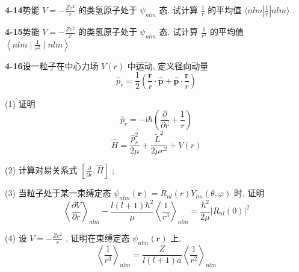 \vfill

\newpage
\vfill

\noindent
\textbf{4-14}\quad 势能 $V = -\frac{Ze^2}{r}$ 的类氢原子处于 $\psi_{nlm}$ 态. 试计算 $\frac{1}{r}$ 的平均值 $\langle nlm|\frac{1}{r}|nlm\rangle$ .

\vfill

\newpage
\vfill

\noindent
\textbf{4-15}\quad 势能 $V = -\frac{Ze^2}{r}$ 的类氢原子处于 $\psi_{nlm}$ 态. 试计算 $\frac{1}{r^2}$ 的平均值 $\left\langle nlm \mid \frac{1}{r^2} \mid nlm \right\rangle$

\vfill

\newpage
\vfill

\noindent
\textbf{4-16}\quad 设一粒子在中心力场 $V(r)$ 中运动, 定义径向动量
\begin{equation}\tag{1}
\hat {p} _ {r} = \frac {1}{2} \left(\frac {\boldsymbol {r}}{r} \cdot \hat {\boldsymbol {p}} + \hat {\boldsymbol {p}} \cdot \frac {\boldsymbol {r}}{r}\right)
\end{equation}

(1) 证明
\begin{equation}\tag{2}
\hat {p} _ {r} = - \mathrm{i} \hbar \left(\frac {\partial}{\partial r} + \frac {1}{r}\right)
\end{equation}
\begin{equation}\tag{3}
\hat {H} = \frac {\hat {p} _ {r} ^ {2}}{2 \mu} + \frac {\tilde {L} ^ {2}}{2 \mu r ^ {2}} + V (r)
\end{equation}

(2) 计算对易关系式 $\left[\frac{\partial}{\partial r}, \hat{H}\right]$ ; 

(3) 当粒子处于某一束缚定态 $\psi_{nlm}(\boldsymbol{r}) = R_{nl}(r)Y_{lm}(\theta, \varphi)$ 时, 证明
\begin{equation}\tag{4}
\left\langle \frac {\partial V}{\partial r} \right\rangle_ {n l m} - \frac {l (l + 1) \hbar^ {2}}{\mu} \left\langle \frac {1}{r ^ {3}} \right\rangle_ {n l m} = \frac {\hbar^ {2}}{2 \mu} \left| R _ {n l} (0) \right| ^ {2}
\end{equation}

(4) 设 $V = -\frac{Ze^2}{r}$ , 证明在束缚定态 $\psi_{nlm}(\pmb{r})$ 上,
\begin{equation}\tag{5}
\left\langle \frac {1}{r ^ {3}} \right\rangle_ {n l m} = \frac {Z}{l (l + 1) a} \left\langle \frac {1}{r ^ {2}} \right\rangle_ {n l m}
\end{equation}

\vfill

